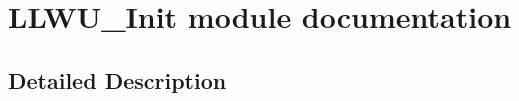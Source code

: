 \hypertarget{group___l_l_w_u___init__module}{}\section{L\+L\+W\+U\+\_\+\+Init module documentation}
\label{group___l_l_w_u___init__module}


\subsection{Detailed Description}

